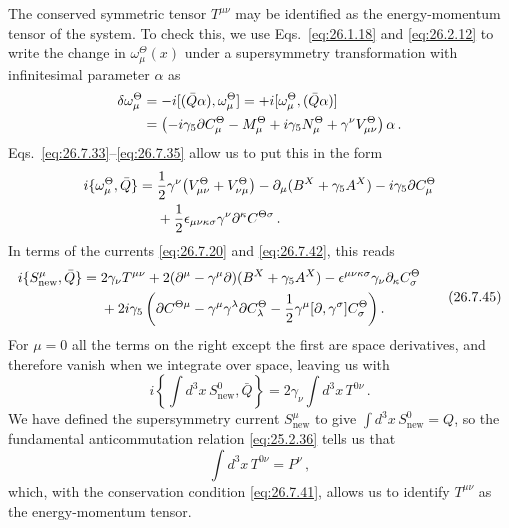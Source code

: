 The conserved symmetric tensor \(T^{\mu\nu}\) may be identified as the
energy-momentum tensor of the system. To check this, we use
Eqs.~\eqref{eq:26.1.18} and \eqref{eq:26.2.12} to write the change in
\(\omega_\mu^\Theta(x)\) under a supersymmetry transformation with
infinitesimal parameter \(\alpha\) as
\[
  \begin{aligned}
  \delta\omega_\mu^\Theta
  &=-i[(\bar Q\alpha),\omega_\mu^\Theta]
    =+i[\omega_\mu^\Theta,(\bar Q\alpha)]
  \\
  &=\left(
    -i\gamma_5\sl{\partial}C_\mu^\Theta
    -M_\mu^\Theta+i\gamma_5N_\mu^\Theta
    +\gamma^\nu V_{\mu\nu}^\Theta
  \right)\alpha\,.
  \end{aligned}
\]
Eqs.~\eqref{eq:26.7.33}--\eqref{eq:26.7.35} allow us to put this in the
form
\[
  \begin{aligned}
  i\{\omega_\mu^\Theta,\bar Q\}
  ={}&\frac12\gamma^\nu
      \bigl(V_{\mu\nu}^\Theta+V_{\nu\mu}^\Theta\bigr)
     -\partial_\mu(B^X+\gamma_5A^X)
     -i\gamma_5\sl{\partial}C_\mu^\Theta
  \\
     &+\frac12\epsilon_{\mu\nu\kappa\sigma}
      \gamma^\nu\partial^\kappa C^{\Theta\sigma}\,.
  \end{aligned}
\]
In terms of the currents \eqref{eq:26.7.20} and \eqref{eq:26.7.42}, this
reads
\begin{equation}
  \begin{aligned}
  i\{S_{\mathrm{new}}^\mu,\bar Q\}
  ={}&2\gamma_\nu T^{\mu\nu}
     +2(\partial^\mu-\gamma^\mu\sl{\partial})
      (B^X+\gamma_5A^X)
     -\epsilon^{\mu\nu\kappa\sigma}\gamma_\nu
      \partial_\kappa C_\sigma^\Theta
  \\
    &+2i\gamma_5\left(
       \sl{\partial}C^{\Theta\mu}
       -\gamma^\mu\gamma^\lambda\sl{\partial}C_\lambda^\Theta
       -\frac12\gamma^\mu[\sl{\partial},\gamma^\sigma]
        C_\sigma^\Theta
      \right).
  \end{aligned}
  \tag{26.7.45}\label{eq:26.7.45}
\end{equation}
For \(\mu=0\) all the terms on the right except the first are space
derivatives, and therefore vanish when we integrate over space, leaving us
with
\begin{equation}
  i\left\{
    \int d^3x\,S_{\mathrm{new}}^0,\bar Q
  \right\}
  =2\gamma_\nu\int d^3x\,T^{0\nu}\,.
  \tag{26.7.46}\label{eq:26.7.46}
\end{equation}
We have defined the supersymmetry current \(S_{\mathrm{new}}^\mu\) to give
\(\int d^3x\,S_{\mathrm{new}}^0=Q\), so the fundamental anticommutation
relation \eqref{eq:25.2.36} tells us that
\begin{equation}
  \int d^3x\,T^{0\nu}=P^\nu\,,
  \tag{26.7.47}\label{eq:26.7.47}
\end{equation}
which, with the conservation condition \eqref{eq:26.7.41}, allows us to
identify \(T^{\mu\nu}\) as the energy-momentum tensor.

